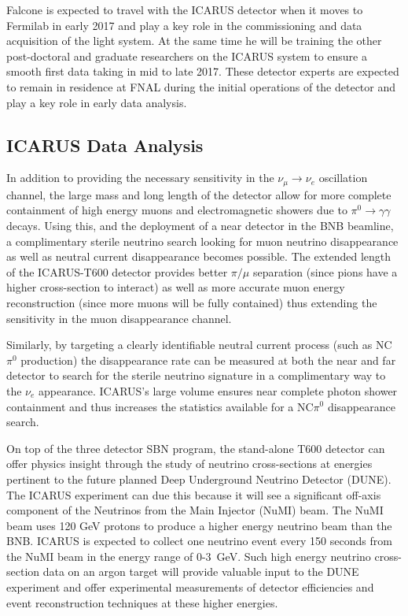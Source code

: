 Falcone is expected to travel with the ICARUS detector when it moves to Fermilab in early 2017 and play a key role in the commissioning and data acquisition of the light system. At the same time he will be training the other post-doctoral and graduate researchers on the ICARUS system to ensure a smooth first data taking in mid to late 2017. These detector experts are expected to remain in residence at FNAL during the initial operations of the detector and play a key role in early data analysis.

\subsection{ICARUS Data Analysis}\label{sec:ICARUSDataAnalysis}
In addition to providing the necessary sensitivity in the $\nu_{\mu} \rightarrow \nu_{e}$ oscillation channel, the large mass and long length of the detector allow for more complete containment of high energy muons and electromagnetic showers due to $\pi^{0} \rightarrow \gamma \gamma$ decays. Using this, and the deployment of a near detector in the BNB beamline, a complimentary sterile neutrino search looking for muon neutrino disappearance as well as neutral current disappearance becomes possible. The extended length of the ICARUS-T600 detector provides better $\pi / \mu$ separation (since pions have a higher cross-section to interact) as well as more accurate muon energy reconstruction (since more muons will be fully contained) thus extending the sensitivity in the muon disappearance channel. 

Similarly, by targeting a clearly identifiable neutral current process (such as NC$\pi^{0}$ production) the disappearance rate can be measured at both the near and far detector to search for the sterile neutrino signature in a complimentary way to the $\nu_{e}$ appearance. ICARUS's large volume ensures near complete photon shower containment and thus increases the statistics available for a NC$\pi^{0}$ disappearance search.

On top of the three detector SBN program, the stand-alone T600 detector can offer physics insight through the study of neutrino cross-sections at energies pertinent to the future planned Deep Underground Neutrino Detector (DUNE). The ICARUS experiment can due this because it will see a significant off-axis component of the Neutrinos from the Main Injector (NuMI) beam. The NuMI beam uses 120 GeV protons to produce a higher energy neutrino beam than the BNB. ICARUS is expected to collect one neutrino event every 150 seconds from the NuMI beam in the energy range of 0-3~GeV. Such high energy neutrino cross-section data on an argon target will provide valuable input to the DUNE experiment and offer experimental measurements of detector efficiencies and event reconstruction techniques at these higher energies.

